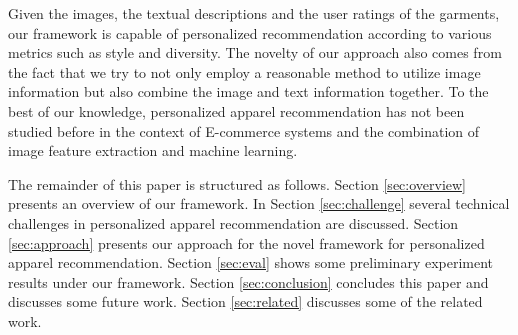 Given the images, the textual descriptions and the user ratings of the garments,
  our framework is capable of personalized recommendation according to various metrics
  such as style and diversity.
The novelty of our approach also comes from the fact that
  we try to not only employ a reasonable method to utilize 
  image information but also combine the image and text information together.
To the best of our knowledge, personalized apparel recommendation has not been 
  studied before in the context of E-commerce systems and the combination of 
  image feature extraction and machine learning.

The remainder of this paper is structured as follows. 
Section \ref{sec:overview} presents an overview of our framework. In Section \ref{sec:challenge} several technical challenges in personalized apparel recommendation are discussed.
Section \ref{sec:approach} presents our approach for the novel framework for personalized apparel recommendation.
Section \ref{sec:eval} shows some preliminary experiment results under our framework.
Section \ref{sec:conclusion} concludes this paper and discusses some future work.
Section \ref{sec:related} discusses some of the related work.


